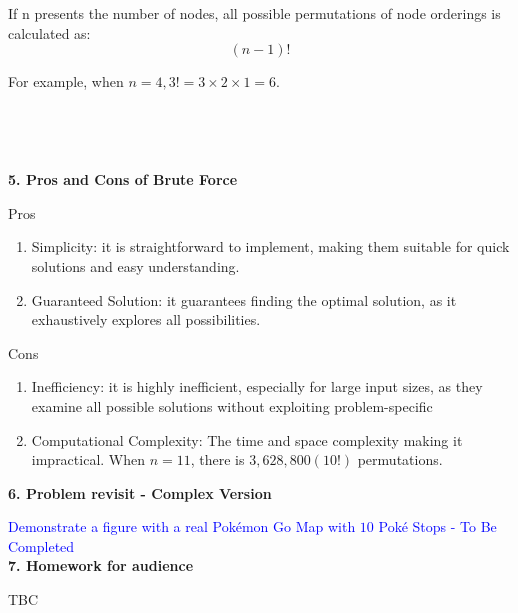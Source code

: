 \documentclass{article}
\begin{document}
If n presents the number of nodes, all possible permutations of node orderings is calculated as:
\[(n-1)!\]

For example, when $n = 4, 3! = 3 \times 2 \times 1 = 6$.\\\\\\\\\\

\textbf{5. Pros and Cons of Brute Force}

Pros
    \begin{enumerate}
        \item Simplicity: it is straightforward to implement, making them suitable for quick solutions and easy understanding.
        \item Guaranteed Solution: it guarantees finding the optimal solution, as it exhaustively explores all possibilities.
    \end{enumerate}

Cons
    \begin{enumerate}
        \item Inefficiency: it is highly inefficient, especially for large input sizes, as they examine all possible solutions without exploiting problem-specific
        \item Computational Complexity: The time and space complexity making it impractical. When $n=11$, there is $3,628,800 (10!)$ permutations. 
    \end{enumerate}

\textbf{6. Problem revisit - Complex Version}

\textcolor{blue}{Demonstrate a figure with a real Pokémon Go Map with $10$ Poké Stops - To Be Completed}\\


\textbf{7. Homework for audience}

TBC
\end{document}

